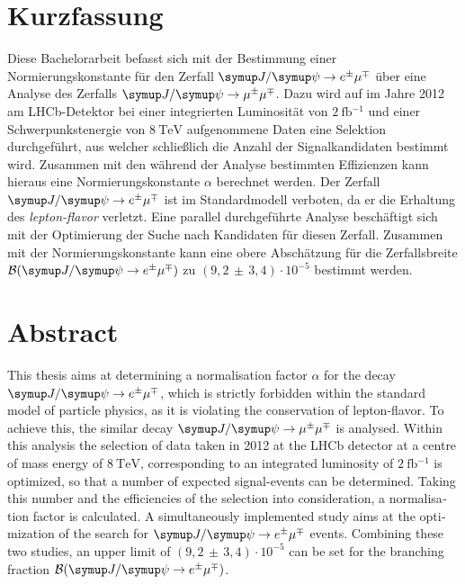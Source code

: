\thispagestyle{plain}

\section*{Kurzfassung}
Diese Bachelorarbeit befasst sich mit der Bestimmung einer Normierungskonstante für den Zerfall $\signal$ über eine Analyse des Zerfalls $\kontroll$. Dazu wird auf im Jahre 2012 am LHCb-Detektor bei einer integrierten Luminosität von $\SI{2}{\femto\barn^{-1}}$ und einer Schwerpunkstenergie von $\SI{8}{\tera\electronvolt}$ aufgenommene Daten eine Selektion durchgeführt, aus welcher schließlich die Anzahl der Signalkandidaten bestimmt wird. Zusammen mit den während der Analyse bestimmten Effizienzen kann hieraus eine Normierungskonstante $\alpha$ berechnet werden. Der Zerfall $\signal$ ist im Standardmodell verboten, da er die Erhaltung des \textit{lepton-flavor} verletzt. Eine parallel durchgeführte Analyse beschäftigt sich mit der Optimierung der Suche nach Kandidaten für diesen Zerfall. Zusammen mit der Normierungskonstante kann eine obere Abschätzung für die Zerfallsbreite $\mathcal{B}(\signal)$ zu $(9,2\,\pm\,3,4)\cdot10^{-5}$ bestimmt werden.

\section*{Abstract}
\begin{english}
This thesis aims at determining a normalisation factor $\alpha$ for the decay $\signal$, which is strictly forbidden within the standard model of particle physics, as it is violating the conservation of lepton-flavor. To achieve this, the similar decay $\kontroll$ is analysed. Within this analysis the selection of data taken in 2012 at the LHCb detector at a centre of mass energy of $\SI{8}{\tera\electronvolt}$, corresponding to an integrated luminosity of $\SI{2}{\femto\barn^{-1}}$ is optimized, so that a number of expected signal-events can be determined. Taking this number and the efficiencies of the selection into consideration, a normalisation factor is calculated. A simultaneously implemented study aims at the optimization of the search for $\signal$ events. Combining these two studies, an upper limit of $(9,2\,\pm\,3,4)\cdot10^{-5}$ can be set for the branching fraction $\mathcal{B}(\signal)$.
\end{english}
